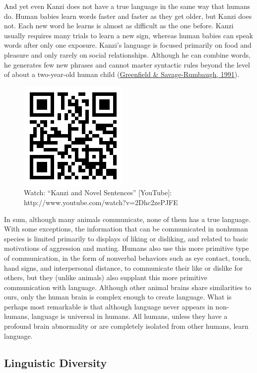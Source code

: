 \documentclass[
]{krantz}
\begin{document}
And yet even Kanzi does not have a true language in the same way that humans do. Human babies learn words faster and faster as they get older, but Kanzi does not. Each new word he learns is almost as difficult as the one before. Kanzi usually requires many trials to learn a new sign, whereas human babies can speak words after only one exposure. Kanzi's language is focused primarily on food and pleasure and only rarely on social relationships. Although he can combine words, he generates few new phrases and cannot master syntactic rules beyond the level of about a two-year-old human child (\protect\hyperlink{ref-Greenfield1991}{Greenfield \& Savage-Rumbaugh, 1991}).

\begin{figure}

{\centering \includegraphics[width=0.25\linewidth]{images/ch8/qr} 

}

\caption{Watch: “Kanzi and Novel Sentences” [YouTube]: http://www.youtube.com/watch?v=2Dhc2zePJFE}\label{fig:qr}
\end{figure}

In sum, although many animals communicate, none of them has a true language. With some exceptions, the information that can be communicated in nonhuman species is limited primarily to displays of liking or disliking, and related to basic motivations of aggression and mating. Humans also use this more primitive type of communication, in the form of nonverbal behaviors such as eye contact, touch, hand signs, and interpersonal distance, to communicate their like or dislike for others, but they (unlike animals) also supplant this more primitive communication with language. Although other animal brains share similarities to ours, only the human brain is complex enough to create language. What is perhaps most remarkable is that although language never appears in non-humans, language is universal in humans. All humans, unless they have a profound brain abnormality or are completely isolated from other humans, learn language.

\hypertarget{linguistic-diversity}{%
\subsection*{Linguistic Diversity}\label{linguistic-diversity}}
\end{document}
